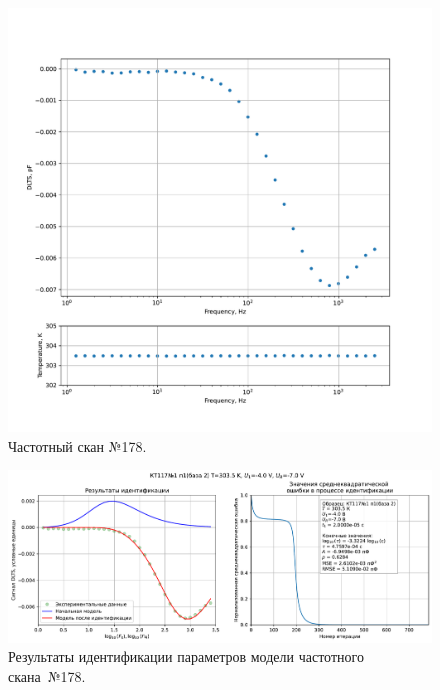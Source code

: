 \begin{figure}[!ht]
    \centering
    \includegraphics[width=1\textwidth]{../plots/КТ117№1_п1(база 2)_2500Гц-1Гц_1пФ_+30С_-4В-7В_100мВ_20мкс_шаг_0,1.pdf}
    \caption{Частотный скан №178.}
    \label{pic:frequency_scan_178}
\end{figure}

\begin{figure}[!ht]
    \centering
    \includegraphics[width=1\textwidth]{../plots/КТ117№1_п1(база 2)_2500Гц-1Гц_1пФ_+30С_-4В-7В_100мВ_20мкс_шаг_0,1_model.pdf}
    \caption{Результаты идентификации параметров модели частотного скана~№178.}
    \label{pic:frequency_scan_model178}
\end{figure}

\pagebreak


